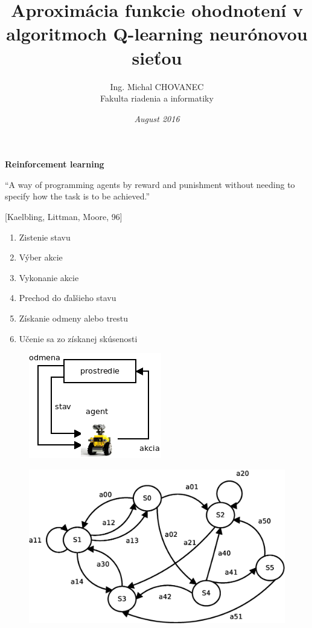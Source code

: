 \documentclass[xcolor=dvipsnames]{beamer}
\title{\bf Aproximácia funkcie ohodnotení v algoritmoch Q-learning neurónovou sieťou}
\author{Ing. Michal CHOVANEC \\Fakulta riadenia a informatiky}
\date[EURP]{\it August 2016}
\begin{document}
\begin{frame}
\titlepage
\end{frame}



\begin{frame}{\bf Reinforcement learning}

“A way of programming agents by reward and
punishment without needing to specify how the
task is to be achieved.”

[Kaelbling, Littman, Moore, 96]

\begin{minipage}{.5\textwidth}

\begin{enumerate}
  \item Zistenie stavu
  \item Výber akcie
  \item Vykonanie akcie
  \item Prechod do ďalšieho stavu
  \item Získanie odmeny alebo trestu
  \item Učenie sa zo získanej skúsenosti
\end{enumerate}

  \end{minipage}%
\begin{minipage}{.5\textwidth}

  \begin{figure}[!htb]
  \centering
  \includegraphics[scale=.4]{../diagrams/agent.png}
  \end{figure}

  \begin{figure}[!htb]
  \centering
  \includegraphics[scale=.2]{../diagrams/markovov_process.eps}
  \end{figure}

\end{minipage}

\end{frame}
\end{document}
